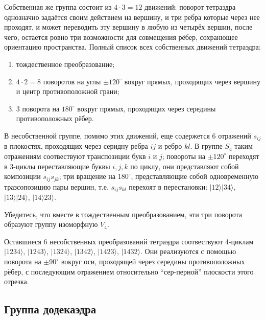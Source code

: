 Собственная же группа состоит из $4 \cdot 3 = 12$ движений: поворот тетраэдра однозначно задаётся своим действием на вершину, и три ребра которые через нее проходят, и может переводить эту вершину в любую из четырёх вершин, после чего, остается ровно три возможности для совмещения рёбер, сохранющее ориентацию пространства. Полный список всех собственных движений тетраэдра: 
\begin{enumerate}
    \item тождественное преобразование;
    \item $4\cdot 2 = 8$ поворотов на углы $\pm 120^\circ$ вокруг прямых, проходящих через вершину и центр противоположной грани;
    \item 3 поворота на $180^\circ$ вокруг прямых, проходящих через середины противоположных рёбер.
\end{enumerate}

В несобственной группе, помимо этих движений, еще содержется 6 отражений $s_{ij}$ в плокостях, проходящих через серидну ребра $ij$ и ребро $kl$. В группе $S_4$ таким отражениям соотвествуют транспозиции букв $i$ и $j$; повороты на $\pm 120^\circ$ переходят в 3-циклы переставляющие буквы $i,j,k$ по циклу, они представляют собой композиции $s_{ij}s_{jk}$; три вращение на $180^\circ$, представляющие собой одновременную тразсопозицию пары вершин, т.е. $s_{ij}s_{kl}$ перехоят в перестановки: $|12\rangle |34\rangle$, $|13\rangle |24\rangle$, $|14\rangle 23\rangle$.

\begin{practice}
    Убедитесь, что вместе в тождественным преобразованием, эти три поворота образуют группу изоморфную $V_4$.
\end{practice}

Оставшиеся 6 несобственных преобразований тетраэдра соотвествуют 4-циклам $|1234\rangle$, $| 1243 \rangle$, $|1324 \rangle $, $| 1342 \rangle $, $|1423 \rangle $, $| 1432 \rangle$. Они реализуются с помощью поворота на $\pm 90^\circ$ вокруг оси, проходящей через середины противоположных рёбер, с последующим отражением относительно ``сер-перной'' плоскости этого отрезка.

\subsection{Группа додекаэдра}


